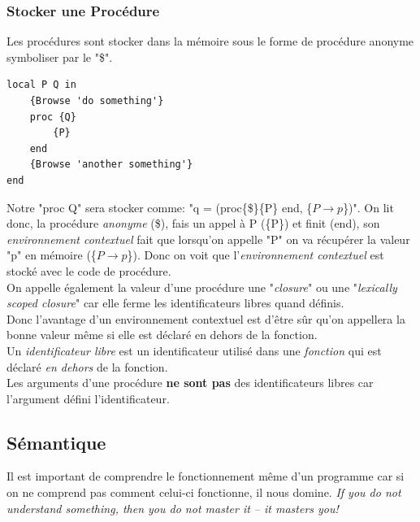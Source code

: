 \documentclass{report}
\begin{document}
\subsubsection{Stocker une Procédure}
Les procédures sont stocker dans la mémoire sous le forme de procédure anonyme symboliser par le "\$".
\begin{lstlisting}
local P Q in
	{Browse 'do something'}
	proc {Q}
		{P}
	end
	{Browse 'another something'}
end
\end{lstlisting}
Notre "proc {Q}" sera stocker comme: "q = (proc\{\$\}\{P\} end, \{$P\rightarrow p$\})". On lit donc, la procédure \textit{anonyme} (\$), fais un appel à P (\{P\}) et finit (end), son \textit{environnement contextuel} fait que lorsqu'on appelle "P" on va récupérer la valeur "p" en mémoire (\{$P\rightarrow p$\}). Donc on voit que l'\textit{environnement contextuel} est stocké avec le code de procédure.\\
On appelle également la valeur d'une procédure une "\textit{closure}" ou une "\textit{lexically scoped closure}" car elle ferme les identificateurs libres quand définis.\\
Donc l'avantage d'un environnement contextuel est d'être sûr qu'on appellera la bonne valeur même si elle est déclaré en dehors de la fonction.\\

Un \textit{identificateur libre} est un identificateur utilisé dans une \textit{fonction} qui est déclaré \textit{en dehors} de la fonction.\\
Les arguments d'une procédure \textbf{ne sont pas} des identificateurs libres car l'argument défini l'identificateur.

\subsection{Sémantique}
Il est important de comprendre le fonctionnement même d'un programme car si on ne comprend pas comment celui-ci fonctionne, il nous domine. \textit{If you do not understand something, then you do not master it – it masters you!}
\end{document}
